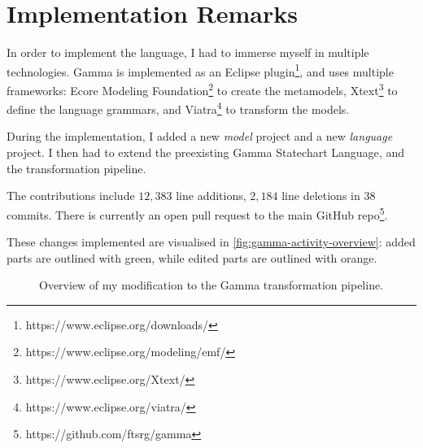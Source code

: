 \section{Implementation Remarks}\label{sec:implementation-remarks}

In order to implement the language, I had to immerse myself in multiple technologies. Gamma is implemented as an Eclipse plugin\footnote{https://www.eclipse.org/downloads/}, and uses multiple frameworks: Ecore Modeling Foundation\footnote{https://www.eclipse.org/modeling/emf/} to create the metamodels, Xtext\footnote{https://www.eclipse.org/Xtext/} to define the language grammars, and Viatra\footnote{https://www.eclipse.org/viatra/} to transform the models.

During the implementation, I added a new \emph{model} project and a new \emph{language} project. I then had to extend the preexisting Gamma Statechart Language, and the transformation pipeline.

The contributions include \(12,383\) line additions, \(2,184\) line deletions in \(38\) commits. There is currently an open pull request to the main GitHub repo\footnote{https://github.com/ftsrg/gamma}.

These changes implemented are visualised in \autoref{fig:gamma-activity-overview}: added parts are outlined with green, while edited parts are outlined with orange.

\begin{figure}[!ht]
	\centering
	
	\caption{Overview of my modification to the Gamma transformation pipeline.}
	\label{fig:gamma-activity-overview}
\end{figure}
